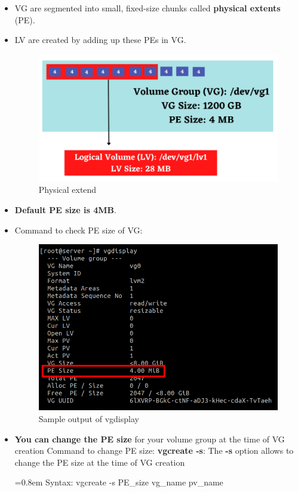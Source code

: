 \setlength{\columnsep}{3pt}
\begin{flushleft}
	
	\begin{itemize}
		\item VG are segmented into small, fixed-size chunks called \textbf{physical extents} (PE).
		\item LV are created by adding up these PEs in VG.
		\begin{figure}[h!]
			\centering
			\includegraphics[scale=.55]{content/chapter9/images/pe.png}
			\caption{Physical extend}
			\label{fig:pe_le}
		\end{figure}	
		\item \textbf{Default PE size is 4MB}.
		\item Command to check PE size of VG:
		\begin{figure}[h!]
			\centering
			\includegraphics[scale=.4]{content/chapter9/images/p2.png}
			\caption{Sample output of vgdisplay}
			\label{fig:PE size}
		\end{figure}
		\newpage
		\item \textbf{You can change the PE size} for your volume group at the time of VG creation
		\newline
		Command to change PE size:
		\newline
		\textbf{vgcreate -s}: The \textbf{-s} option allows to change the PE size at the time of VG creation
		\bigskip 
		\begin{tcolorbox}[breakable,notitle,boxrule=-0pt,colback=pink,colframe=pink]
			\color{black}
			\font=0.8em
			Syntax: vgcreate -s PE\_size vg\_name pv\_name
			\font=4pt
		\end{tcolorbox}
		

\end{itemize}
\end{flushleft}
